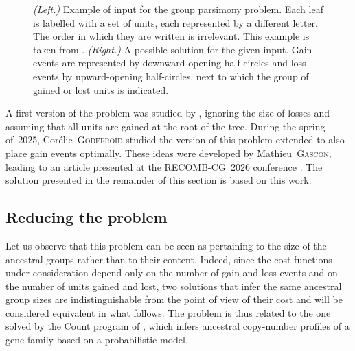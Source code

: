 \begin{figure}[h]
    \capstart
    \centering
    
    \caption[Instance of and solution to a group parsimony problem]{
        \emph{(Left.)} Example of input for the group parsimony problem.
        Each leaf is labelled with a set of units, each represented by a different letter.
        The order in which they are written is irrelevant.
        This example is taken from \textcite{Gascon2026GeneRepertoireEvolution}.
        \emph{(Right.)} A possible solution for the given input.
        Gain events are represented by downward-opening half-circles and loss events by upward-opening half-circles, next to which the group of gained or lost units is indicated.
        \label{fig:adp-rec:set-example}
    }
\end{figure}

A first version of the problem was studied by \textcite{Delabre2020EvolutionSegmentalDuplications}, ignoring the size of losses and assuming that all units are gained at the root of the tree.
During the spring of~2025, Corélie~\textsc{Godefroid} studied the version of this problem extended to also place gain events optimally.
These ideas were developed by Mathieu~\textsc{Gascon}, leading to an article presented at the RECOMB-CG~2026 conference \parencite{Gascon2026GeneRepertoireEvolution}.
The solution presented in the remainder of this section is based on this work.

\subsection{Reducing the problem}

Let us observe that this problem can be seen as pertaining to the size of the ancestral groups rather than to their content.
Indeed, since the cost functions under consideration depend only on the number of gain and loss events and on the number of units gained and lost, two solutions that infer the same ancestral group sizes are indistinguishable from the point of view of their cost and will be considered equivalent in what follows.
The problem is thus related to the one solved by the Count program of \textcite{Csuros2010CountEvolutionaryAnalysis}, which infers ancestral copy-number profiles of a gene family based on a probabilistic model.

